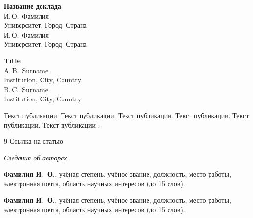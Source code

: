 \documentclass[12pt,a4paper]{article}
\begin{document}
\renewcommand\refname{\centering \textit{\small{Литература}}}

\begin{center}
{\large\bf Название доклада} \\[5mm] И.\,О.~Фамилия \\
 Университет, Город, Страна \\
 И.\,О.~Фамилия\\ Университет,  Город, Страна
\end{center}
\begin{abstract}
Текст аннотации...
\end{abstract}

\begin{center}
{\large\bf  Title}  \\ A.\,B.~Surname \\
 Institution, City, Country \\
 B.\,C.~Surname\\ Institution,  City, Country 
\end{center}

Текст публикации. Текст публикации. Текст публикации. Текст публикации. Текст публикации. Текст публикации \cite{Paper1}.

\begin{thebibliography}{9}
Ссылка на статью
\end{thebibliography}

\begin{center}
\textit{\large Сведения об авторах}
\end{center}

\textbf{Фамилия И.~О.}, учёная степень, учёное звание, должность, место работы, электронная почта, область научных интересов (до 15 слов).

\textbf{Фамилия И.~О.}, учёная степень, учёное звание, должность, место работы, электронная почта, область научных интересов (до 15 слов).
\end{document}
